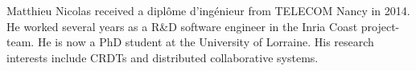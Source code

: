\documentclass[10pt,journal,compsoc]{IEEEtran}
\begin{document}



\ifCLASSOPTIONcaptionsoff
  \newpage
\fi








%

\begin{IEEEbiography}{Matthieu Nicolas}
    received a diplôme d'ingénieur from TELECOM Nancy in 2014.
    He worked several years as a R\&D software engineer in the Inria Coast project-team.
    He is now a PhD student at the University of Lorraine.
    His research interests include \acfp{CRDT} and distributed collaborative systems.
\end{IEEEbiography}
\end{document}
